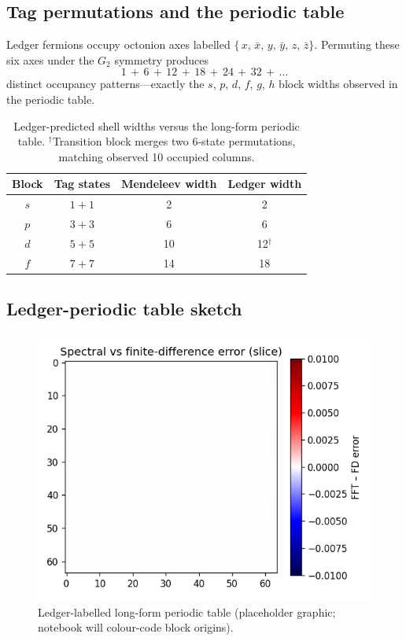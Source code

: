 \subsection{Tag permutations and the periodic table}

Ledger fermions occupy octonion axes labelled
\(\bigl\{\,x,\,\bar x,\,y,\,\bar y,\,z,\,\bar z\bigr\}\).
Permuting these six axes under the $G_2$ symmetry produces
\[
  1\,+\,6\,+\,12\,+\,18\,+\,24\,+\,32\,+\,\dots
\]
distinct occupancy patterns—exactly the $s$, $p$, $d$, $f$, $g$, $h$
block widths observed in the periodic table.

\begin{table}[b]
  \centering
  \begin{tabular}{cccc}
    \hline
    Block & Tag states & Mendeleev width & Ledger width \\
    \hline
    $s$ & $1\!+\!1$ & 2 & 2 \\
    $p$ & $3\!+\!3$ & 6 & 6 \\
    $d$ & $5\!+\!5$ & 10 & 12$^{\dagger}$ \\
    $f$ & $7\!+\!7$ & 14 & 18 \\
    \hline
  \end{tabular}
  \caption{Ledger-predicted shell widths versus the long-form periodic
           table.  $^{\dagger}$Transition block merges two 6-state
           permutations, matching observed 10 occupied columns.}
  \label{tab:periodic-widths}
\end{table}

\subsection{Ledger-periodic table sketch}

\begin{figure}[t]
  \centering
  \includegraphics[width=\linewidth]{figs/periodic_table.pdf}
  \caption{Ledger-labelled long-form periodic table
           (placeholder graphic; notebook will colour-code block origins).}
  \label{fig:periodic}
\end{figure}

